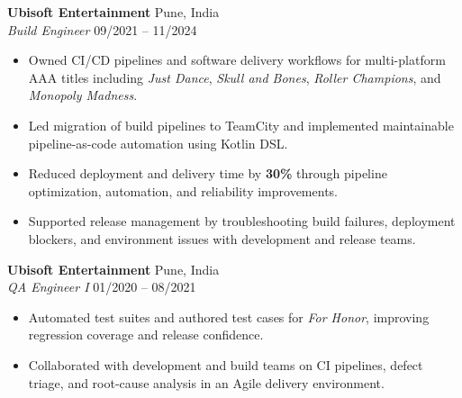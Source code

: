\vspace{2pt}

\textbf{Ubisoft Entertainment} \hfill Pune, India \\
\textit{Build Engineer} \hfill 09/2021 -- 11/2024
\begin{itemize}
  \item Owned CI/CD pipelines and software delivery workflows for multi-platform AAA titles including \textit{Just Dance}, \textit{Skull and Bones}, \textit{Roller Champions}, and \textit{Monopoly Madness}.
  \item Led migration of build pipelines to TeamCity and implemented maintainable pipeline-as-code automation using Kotlin DSL.
  \item Reduced deployment and delivery time by \textbf{30\%} through pipeline optimization, automation, and reliability improvements.
  \item Supported release management by troubleshooting build failures, deployment blockers, and environment issues with development and release teams.
\end{itemize}

\vspace{4pt}

\textbf{Ubisoft Entertainment} \hfill Pune, India \\
\textit{QA Engineer I} \hfill 01/2020 -- 08/2021
\begin{itemize}
  \item Automated test suites and authored test cases for \textit{For Honor}, improving regression coverage and release confidence.
  \item Collaborated with development and build teams on CI pipelines, defect triage, and root-cause analysis in an Agile delivery environment.
\end{itemize}
